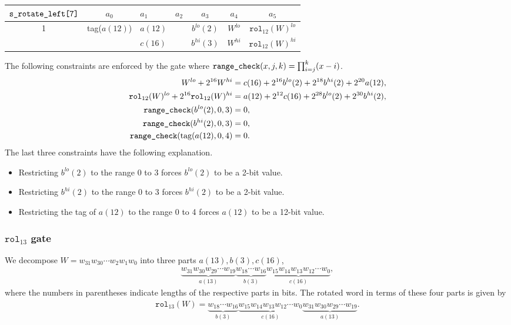 \documentclass[10pt]{article}
\begin{document}
\begin{center}
  \begin{tabular}{c|c|l|l|c|c|c}
    $\texttt{s\textunderscore rotate\textunderscore left[7]}$ & $a_0$ & $a_1$ & $a_2$ & $a_3$ & $a_4$ & $a_5$ \\ \hline
    1  & tag($a(12)$) & $a(12)$ &                        & $b^{lo}(2)$ & $W^{lo}$  & $\texttt{rol}_{12}(W)^{lo}$  \\ 
       &              & $c(16)$ &                        & $b^{hi}(3)$ & $W^{hi}$  & $\texttt{rol}_{12}(W)^{hi}$  \\ \hline
  \end{tabular}
\end{center}

The following constraints are enforced by the gate where $\texttt{range\textunderscore check}(x, j, k) = \prod_{i=j}^k (x-i)$.
\begin{align*}
  W^{lo} + 2^{16} W^{hi} & = c(16) + 2^{16} b^{lo}(2) + 2^{18} b^{hi}(2) + 2^{20} a(12),\\
  \texttt{rol}_{12}(W)^{lo} + 2^{16} \texttt{rol}_{12}(W)^{hi} & = a(12) + 2^{12} c(16) + 2^{28} b^{lo}(2) + 2^{30} b^{hi}(2),\\
  \texttt{range\textunderscore check}(b^{lo}(2), 0, 3) & = 0,\\
  \texttt{range\textunderscore check}(b^{hi}(2), 0, 3) & = 0,\\
  \texttt{range\textunderscore check}(\text{tag}(a(12), 0, 4) & = 0.
\end{align*}
The last three constraints have the following explanation.
\begin{itemize}
\item Restricting $b^{lo}(2)$ to the range 0 to 3 forces $b^{lo}(2)$ to be a 2-bit value.
\item Restricting $b^{hi}(2)$ to the range 0 to 3 forces $b^{hi}(2)$ to be a 2-bit value.
\item Restricting the tag of $a(12)$ to the range 0 to 4 forces $a(12)$ to be a 12-bit value.
\end{itemize}


\subsubsection{$\texttt{rol}_{13}$ gate}%
\label{sec:rol_13_gate}
We decompose $W = w_{31}w_{30}\cdots w_2w_1w_0$ into three parts $a(13), b(3), c(16)$,
\begin{align*}
  \underbrace{w_{31}w_{30}w_{29}\cdots w_{19}}_{a(13)} \underbrace{w_{18}\cdots w_{16}}_{b(3)}
  \underbrace{w_{15}w_{14}w_{13}w_{12}\cdots w_{0}}_{c(16)},
\end{align*}
where the numbers in parentheses indicate lengths of the respective parts in bits. The rotated word in terms of these four parts is given by
\begin{align*}
  \texttt{rol}_{13}(W) = 
  \underbrace{w_{18}\cdots w_{16}}_{b(3)}
  \underbrace{w_{15}w_{14}w_{13}w_{12}\cdots w_{0}}_{c(16)}\underbrace{w_{31}w_{30}w_{29}\cdots w_{19}}_{a(13)}.
\end{align*}
\end{document}
